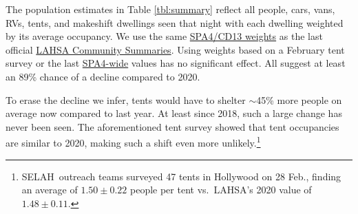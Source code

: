 \documentclass[11pt]{article}
\def\resp{respectively}
\def\selah{SELAH}
\def\nh{957\pm94}
\def\ne{556\pm83}
\begin{document}
 The population estimates in Table \ref{tbl:summary} %
reflect all people, cars, vans, RVs, tents, and makeshift dwellings seen that night with each
dwelling weighted by its average occupancy. We use the same %
\href{https://www.lahsa.org/documents?id=4635-usc-2018-2020-multipliers-and-estimates-overview}
{SPA4/CD13 weights} as the last official 
\href{https://www.lahsa.org/documents?id=4686-2020-greater-los-angeles-city-community-homelessness-report-service-planning-area-4.pdf}
{LAHSA Community Summaries}. 
Using weights based on a February tent survey or the last 
\href{https://www.lahsa.org/documents?id=4693-2020-greater-los-angeles-homeless-count-cvrtm-conversion-factors}{SPA4-wide} values has no significant effect.
All suggest at least an 89\% chance of a decline compared to 2020. 

To erase the decline we infer, tents would have to shelter $\sim$45\% more people on average now 
compared to last year. At least since 2018, such a large change has never been seen. The aforementioned tent survey showed that tent occupancies are similar to 2020, making such a shift even more unlikely.\footnote{\selah\ 
outreach teams surveyed 47 tents in Hollywood on 28 Feb., finding an average of $1.50\pm0.22$ 
people per tent vs.~LAHSA's 2020 value of $1.48\pm0.11$.}
\end{document}
